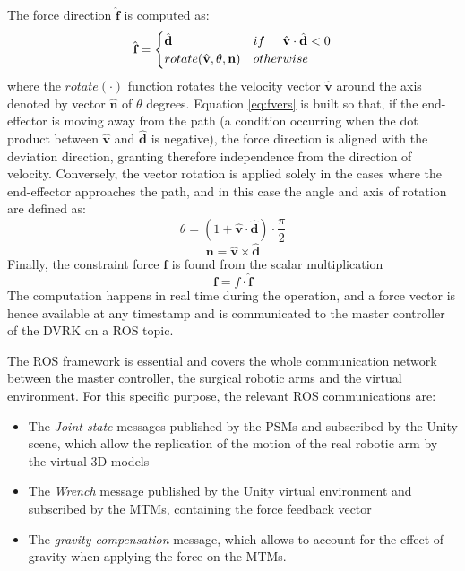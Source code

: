 \documentclass[conference]{IEEEtran}
\newcommand{\vers}[1]{\hat{\textbf{#1}}}
\newcommand{\vect}[1]{\textbf{#1}}
\begin{document}
The force direction $\hat{\textbf{f}}$ is computed as:
\begin{equation}
    \vers{f} = \begin{cases}
        \vers{d} & if \hspace{0.5cm}\vers{v}\cdot\vers{d}<0\\
        rotate(\vers{v},\theta,\vect{n}) & otherwise
        \label{eq:fvers}
    \end{cases}
\end{equation}
where the $rotate(\cdot)$ function rotates the velocity vector
$\hat{\textbf{v}}$ around the axis denoted by vector
$\hat{\textbf{n}}$ of $\theta$ degrees. Equation \ref{eq:fvers} is
built so that, if the end-effector is moving away from the path (a
condition occurring when the dot product between $\vers{v}$ and
$\vers{d}$ is negative), the force direction is aligned with the
deviation direction, granting therefore independence from the
direction of velocity. Conversely, the vector rotation is applied
solely in the cases where the end-effector approaches the path, and in
this case the angle and axis of rotation are defined as:
\begin{equation}
    \theta = (1+\vers{v}\cdot\vers{d})\cdot\frac{\pi}{2}
\end{equation}
\begin{equation}
    \vect{n} = \vers{v}\times\vers{d}
\end{equation}
Finally, the constraint force $\vect{f}$ is found from the scalar
multiplication
\begin{equation}
    \vect{f} = f\cdot\vers{f}
    \label{eq:force}
\end{equation}
The computation happens in real time during the operation, and a force
vector is hence available at any timestamp and is communicated to the
master controller of the DVRK on a ROS topic.

The ROS framework is essential and covers the whole communication
network between the master controller, the surgical robotic arms and
the virtual environment. For this specific purpose, the relevant ROS
communications are:
\begin{itemize}
    \item The \textit{Joint state} messages published by the PSMs and
    subscribed by the Unity scene, which allow the replication of the
    motion of the real robotic arm by the virtual 3D models
    \item The \textit{Wrench} message published by the Unity virtual
    environment and subscribed by the MTMs, containing the force
    feedback vector
    \item The \textit{gravity compensation} message, which allows to
    account for the effect of gravity when applying the force on the
    MTMs.
\end{itemize}
\end{document}
